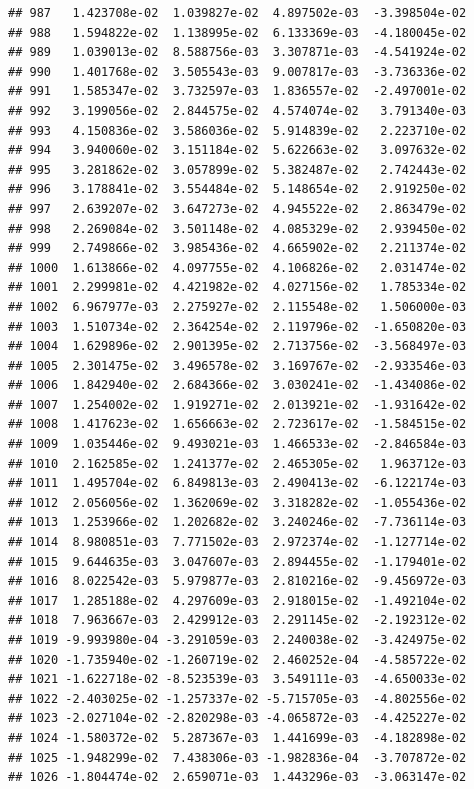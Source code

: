 \documentclass[
]{article}
\begin{document}
\begin{verbatim}
## 987   1.423708e-02  1.039827e-02  4.897502e-03  -3.398504e-02
## 988   1.594822e-02  1.138995e-02  6.133369e-03  -4.180045e-02
## 989   1.039013e-02  8.588756e-03  3.307871e-03  -4.541924e-02
## 990   1.401768e-02  3.505543e-03  9.007817e-03  -3.736336e-02
## 991   1.585347e-02  3.732597e-03  1.836557e-02  -2.497001e-02
## 992   3.199056e-02  2.844575e-02  4.574074e-02   3.791340e-03
## 993   4.150836e-02  3.586036e-02  5.914839e-02   2.223710e-02
## 994   3.940060e-02  3.151184e-02  5.622663e-02   3.097632e-02
## 995   3.281862e-02  3.057899e-02  5.382487e-02   2.742443e-02
## 996   3.178841e-02  3.554484e-02  5.148654e-02   2.919250e-02
## 997   2.639207e-02  3.647273e-02  4.945522e-02   2.863479e-02
## 998   2.269084e-02  3.501148e-02  4.085329e-02   2.939450e-02
## 999   2.749866e-02  3.985436e-02  4.665902e-02   2.211374e-02
## 1000  1.613866e-02  4.097755e-02  4.106826e-02   2.031474e-02
## 1001  2.299981e-02  4.421982e-02  4.027156e-02   1.785334e-02
## 1002  6.967977e-03  2.275927e-02  2.115548e-02   1.506000e-03
## 1003  1.510734e-02  2.364254e-02  2.119796e-02  -1.650820e-03
## 1004  1.629896e-02  2.901395e-02  2.713756e-02  -3.568497e-03
## 1005  2.301475e-02  3.496578e-02  3.169767e-02  -2.933546e-03
## 1006  1.842940e-02  2.684366e-02  3.030241e-02  -1.434086e-02
## 1007  1.254002e-02  1.919271e-02  2.013921e-02  -1.931642e-02
## 1008  1.417623e-02  1.656663e-02  2.723617e-02  -1.584515e-02
## 1009  1.035446e-02  9.493021e-03  1.466533e-02  -2.846584e-03
## 1010  2.162585e-02  1.241377e-02  2.465305e-02   1.963712e-03
## 1011  1.495704e-02  6.849813e-03  2.490413e-02  -6.122174e-03
## 1012  2.056056e-02  1.362069e-02  3.318282e-02  -1.055436e-02
## 1013  1.253966e-02  1.202682e-02  3.240246e-02  -7.736114e-03
## 1014  8.980851e-03  7.771502e-03  2.972374e-02  -1.127714e-02
## 1015  9.644635e-03  3.047607e-03  2.894455e-02  -1.179401e-02
## 1016  8.022542e-03  5.979877e-03  2.810216e-02  -9.456972e-03
## 1017  1.285188e-02  4.297609e-03  2.918015e-02  -1.492104e-02
## 1018  7.963667e-03  2.429912e-03  2.291145e-02  -2.192312e-02
## 1019 -9.993980e-04 -3.291059e-03  2.240038e-02  -3.424975e-02
## 1020 -1.735940e-02 -1.260719e-02  2.460252e-04  -4.585722e-02
## 1021 -1.622718e-02 -8.523539e-03  3.549111e-03  -4.650033e-02
## 1022 -2.403025e-02 -1.257337e-02 -5.715705e-03  -4.802556e-02
## 1023 -2.027104e-02 -2.820298e-03 -4.065872e-03  -4.425227e-02
## 1024 -1.580372e-02  5.287367e-03  1.441699e-03  -4.182898e-02
## 1025 -1.948299e-02  7.438306e-03 -1.982836e-04  -3.707872e-02
## 1026 -1.804474e-02  2.659071e-03  1.443296e-03  -3.063147e-02

\end{verbatim}
\end{document}
